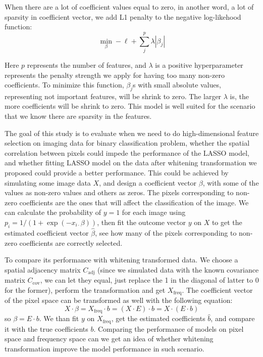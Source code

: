 \documentclass[12pt]{article}
\begin{document}
When there are a lot of coefficient values equal to zero, in another word, a lot of sparsity in coefficient vector, we add L1 penalty to the negative log-likehood function:
\[
  \min_{\beta} - \ell + \sum_j^p \lambda | \beta_j |
\]

Here \( p \) represents the number of features, and \( \lambda \) is a positive hyperparameter represents the penalty strength we apply for having too many non-zero coefficients. To minimize this function, \( \beta_j \)s with small absolute values, representing not important features, will be shrink to zero. The larger \( \lambda \) is, the more coefficients will be shrink to zero. This model is well suited for the scenario that we know there are sparsity in the features.

The goal of this study is to evaluate when we need to do high-dimensional feature selection on imaging data for binary classification problem, whether the spatial correlation between pixels could impede the performance of the LASSO model, and whether fitting LASSO model on the data after whitening transformation we proposed could provide a better performance. This could be achieved by simulating some image data \( X \), and design a coefficient vector \( \beta \), with some of the values as non-zero values and others as zeros. The pixels corresponding to non-zero coefficients are the ones that will affect the classification of the image. We can calculate the probability of \( y = 1 \) for each image using \( p_i = 1 / (1 + \exp(-x_{i \cdot} \beta)) \), then fit the outcome vector \( y \) on \( X \) to get the estimated coefficient vector \( \hat{\beta} \), see how many of the pixels corresponding to non-zero coefficients are correctly selected.

To compare its performance with whitening transformed data. We choose a spatial adjacency matrix \( C_{\text{adj}} \) (since we simulated data with the known covariance matrix \( C_{\text{cov}} \), we can let they equal, just replace the 1 in the diagonal of latter to 0 for the former), perform the transformation and get \( X_{\text{freq}} \). The coefficient vector of the pixel space can be transformed as well with the following equation:
\[
  X \cdot \beta = X_{\text{freq}} \cdot b = (X \cdot E) \cdot b = X \cdot (E \cdot b)
\]
so \( \beta = E \cdot b \). We than fit \( y \) on \( X_{\text{freq}} \), get the estimated coefficients \( \hat{b} \), and compare it with the true coefficients \( b \). Comparing the performance of models on pixel space and frequency space can we get an idea of whether whitening transformation improve the model performance in such scenario.
\end{document}

